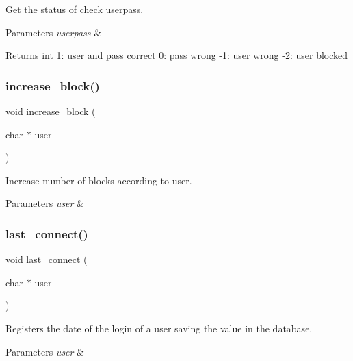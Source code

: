 Get the status of check userpass. 


\begin{DoxyParams}{Parameters}
{\em userpass} & \\
\hline
\end{DoxyParams}
\begin{DoxyReturn}{Returns}
int 1\+: user and pass correct 0\+: pass wrong -\/1\+: user wrong -\/2\+: user blocked 
\end{DoxyReturn}
\mbox{\label{auth_8h_a7262d58710ad875161637d4d2ae75009}} 
\subsubsection{increase\+\_\+block()}
{\footnotesize\ttfamily void increase\+\_\+block (\begin{DoxyParamCaption}\item[{char $\ast$}]{user }\end{DoxyParamCaption})}



Increase number of blocks according to user. 


\begin{DoxyParams}{Parameters}
{\em user} & \\
\hline
\end{DoxyParams}
\mbox{\label{auth_8h_a45125798b5e6b7446e4f699ff5d5ce7e}} 
\subsubsection{last\+\_\+connect()}
{\footnotesize\ttfamily void last\+\_\+connect (\begin{DoxyParamCaption}\item[{char $\ast$}]{user }\end{DoxyParamCaption})}



Registers the date of the login of a user saving the value in the database. 


\begin{DoxyParams}{Parameters}
{\em user} & \\
\hline
\end{DoxyParams}
\mbox{\label{auth_8h_aac12c870325e2f9d95be2cffb49abe78}} 
